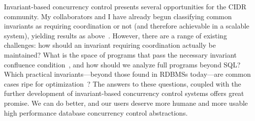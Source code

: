 Invariant-based concurrency control presents several opportunities for the CIDR community. My collaborators and I have already begun classifying common invariants as requiring coordination or not (and therefore achievable in a scalable system), yielding results as above~\cite{coord-avoid}. However, there are a range of existing challenges: how should an invariant requiring coordination actually be maintained? What is the space of programs that pass the necessary invariant confluence condition~\cite{coord-avoid}, and how should we analyze full programs beyond SQL? Which practical invariants---beyond those found in RDBMSs today---are common cases ripe for optimization~\cite{ramp-txns}? The answers to these questions, coupled with the further development of invariant-based concurrency control systems offers great promise. We can do better, and our users deserve more humane and more usable high performance database concurrency control abstractions.\vspace{-2 em}





